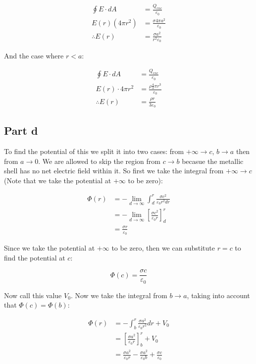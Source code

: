 \documentclass{article}
\theoremstyle{definition}
\numberwithin{equation}{section}
\numberwithin{definition}{section}
\begin{document}
    \begin{align*}
        \oint E \cdot dA &= \frac{Q_{enc}}{\varepsilon_0}\\
        E(r)(4\pi r^2) &= \frac{\sigma 4\pi a^2}{\varepsilon_0}\\
        \therefore E(r) &= \frac{\sigma a^2}{r^2 \varepsilon_0}
    \end{align*}

    And the case where $r < a$:

    \begin{align*}
        \oint E \cdot dA &= \frac{Q_{enc}}{\varepsilon_0}\\
        E(r) \cdot 4\pi r^2 &= \frac{\rho \frac{4}{3} \pi r^3}{\varepsilon_0}\\
        \therefore E(r) &= \frac{\rho r}{3\varepsilon_0}
    \end{align*}

    \subsection{Part d}

    To find the potential of this we split it into two cases: from $+ \infty \to c$, $b \to a$ then from $a \to 0$. We are allowed to skip the region from $c \to b$ becasue the metallic shell has no net electric field within it. So first we take the integral from $+ \infty \to c$ (Note that we take the potential at $+ \infty$ to be zero):

    \begin{align*}
        \Phi(r) &= -\lim_{d \to \infty} \int_d^r \frac{\sigma c^2}{\varepsilon_0 r^2 dr}\\
        &= -\lim_{d \to \infty} \left[\frac{\sigma c^2}{\varepsilon_0 r}\right]_d^r\\
        &= \frac{\sigma r}{\varepsilon_0}
    \end{align*}

    Since we take the potential at $+\infty$ to be zero, then we can substitute $r = c$ to find the potential at $c$:
    
    \[ \Phi(c) = \frac{\sigma c}{\varepsilon_0}\]
    
    Now call this value $V_0$. Now we take the integral from $b \to a$, taking into account that $\Phi(c) = \Phi(b)$: 

    \begin{align*}
        \Phi(r) &= -\int_b^r \frac{\sigma a^2}{\varepsilon_0 r^2} dr + V_0\\
        &= \left[\frac{\sigma a^2}{\varepsilon_0 r}\right]_b^r + V_0\\
        &= \frac{\sigma a^2}{\varepsilon_0 r} - \frac{\sigma a^2}{\varepsilon_0 b}+ \frac{\sigma c}{\varepsilon_0}
    \end{align*}
\end{document}
